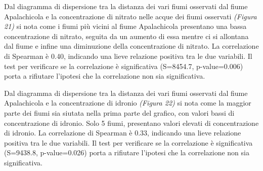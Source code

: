 \documentclass{article} %
\begin{document}
Dal diagramma di dispersione tra la distanza dei vari fiumi osservati dal fiume Apalachicola e la concentrazione di nitrato nelle acque dei fiumi osservati \textit{(Figura 21)} si nota come i fiumi più vicini al fiume Apalachicola presentano una bassa concentrazione di nitrato, seguita da un aumento di essa mentre ci si allontana dal fiume e infine una diminuzione della concentrazione di nitrato.
La correlazione di Spearman è 0.40, indicando una lieve relazione positiva tra le due variabili. 
Il test per verificare se la correlazione è significativa (S=8454.7, p-value=0.006) porta a rifiutare l'ipotesi che la correlazione non sia significativa.

Dal diagramma di dispersione tra la distanza dei vari fiumi osservati dal fiume Apalachicola e la concentrazione di idronio \textit{(Figura 22)} si nota come la maggior parte dei fiumi sia siutata nella prima parte del grafico, con valori bassi di concentrazione di idronio. Solo 5 fiumi, presentano valori elevati di concentrazione di idronio.
La correlazione di Spearman è 0.33, indicando una lieve relazione positiva tra le due variabili. 
Il test per verificare se la correlazione è significativa (S=9438.8, p-value=0.026) porta a rifiutare l'ipotesi che la correlazione non sia significativa.
\end{document}
